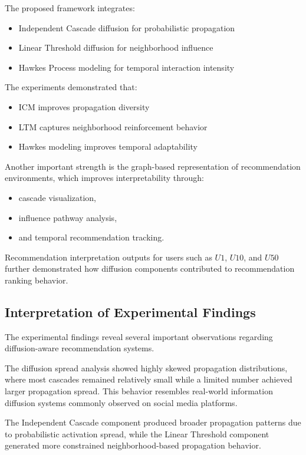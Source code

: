 \documentclass{article}
\begin{document}
The proposed framework integrates:
\begin{itemize}
\item Independent Cascade diffusion for probabilistic propagation
\item Linear Threshold diffusion for neighborhood influence
\item Hawkes Process modeling for temporal interaction intensity
\end{itemize}

The experiments demonstrated that:
\begin{itemize}
\item ICM improves propagation diversity
\item LTM captures neighborhood reinforcement behavior
\item Hawkes modeling improves temporal adaptability
\end{itemize}

Another important strength is the graph-based representation of recommendation environments, which improves interpretability through:
\begin{itemize}
\item cascade visualization,
\item influence pathway analysis,
\item and temporal recommendation tracking.
\end{itemize}

Recommendation interpretation outputs for users such as \(U1\), \(U10\), and \(U50\) further demonstrated how diffusion components contributed to recommendation ranking behavior.

\subsection{Interpretation of Experimental Findings}

The experimental findings reveal several important observations regarding diffusion-aware recommendation systems.

The diffusion spread analysis showed highly skewed propagation distributions, where most cascades remained relatively small while a limited number achieved larger propagation spread. This behavior resembles real-world information diffusion systems commonly observed on social media platforms.

The Independent Cascade component produced broader propagation patterns due to probabilistic activation spread, while the Linear Threshold component generated more constrained neighborhood-based propagation behavior.
\end{document}
